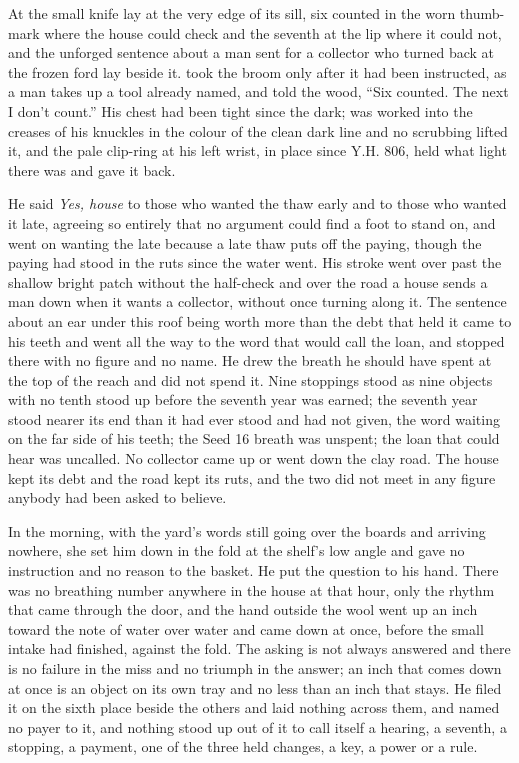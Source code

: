 \scenebreak

At  the small knife lay at the very edge of its sill, six counted in the worn thumb-mark where the house could check and the seventh at the lip where it could not, and the unforged sentence about a man sent for a collector who turned back at the frozen ford lay beside it.  took the broom only after it had been instructed, as a man takes up a tool already named, and told the wood, “Six counted. The next I don't count.” His chest had been tight since the dark;  was worked into the creases of his knuckles in the colour of the clean dark line and no scrubbing lifted it, and the pale clip-ring at his left wrist, in place since Y.H. 806, held what light there was and gave it back.

He said \emph{Yes, house} to those who wanted the thaw early and to those who wanted it late, agreeing so entirely that no argument could find a foot to stand on, and went on wanting the late because a late thaw puts off the paying, though the paying had stood in the ruts since the water went. His stroke went over  past the shallow bright patch without the half-check and over the road a house sends a man down when it wants a collector, without once turning along it. The sentence about an ear under this roof being worth more than the debt that held it came to his teeth and went all the way to the word that would call the loan, and stopped there with no figure and no name. He drew the breath he should have spent at the top of the reach and did not spend it. Nine stoppings stood as nine objects with no tenth stood up before the seventh year was earned; the seventh year stood nearer its end than it had ever stood and had not given, the word waiting on the far side of his teeth; the Seed 16 breath was unspent; the loan that could hear was uncalled. No collector came up or went down the clay road. The house kept its debt and the road kept its ruts, and the two did not meet in any figure anybody had been asked to believe.

\scenebreak

In the morning, with the yard's words still going over the boards and arriving nowhere, she set him down in the fold at the shelf's low angle and gave no instruction and no reason to the basket. He put the question to his hand. There was no breathing number anywhere in the house at that hour, only the rhythm that came through the door, and the hand outside the wool went up an inch toward the note of water over water and came down at once, before the small intake had finished, against the fold. The asking is not always answered and there is no failure in the miss and no triumph in the answer; an inch that comes down at once is an object on its own tray and no less than an inch that stays. He filed it on the sixth place beside the others and laid nothing across them, and named no payer to it, and nothing stood up out of it to call itself a hearing, a seventh, a stopping, a payment, one of the three held changes, a key, a power or a rule.

